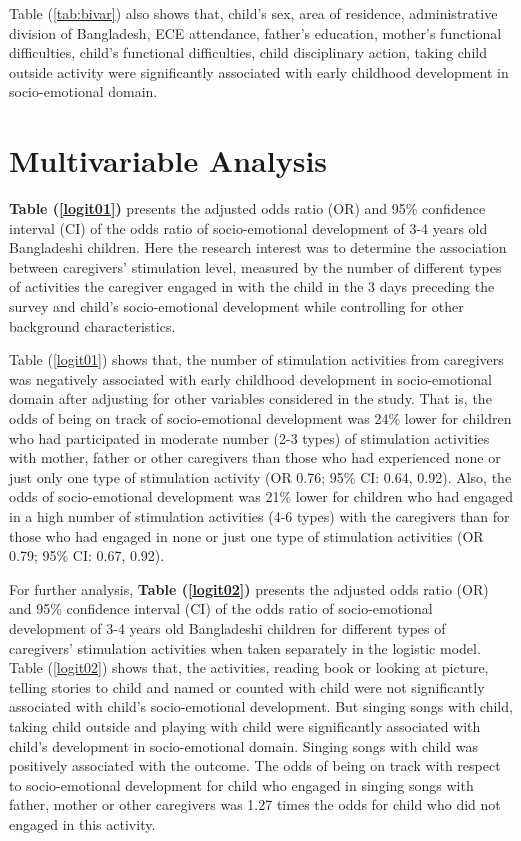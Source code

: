 \documentclass[
  12pt,
  oneside]{report}
\begin{document}
Table (\ref{tab:bivar}) also shows that, child's sex, area of residence, administrative division of Bangladesh, ECE attendance, father's education, mother's functional difficulties, child's functional difficulties, child disciplinary action, taking child outside activity were significantly associated with early childhood development in socio-emotional domain.

\clearpage

\hypertarget{multivariable-analysis}{%
\section{Multivariable Analysis}\label{multivariable-analysis}}

\textbf{Table (\ref{logit01})} presents the adjusted odds ratio (OR) and 95\% confidence interval (CI) of the odds ratio of socio-emotional development of 3-4 years old Bangladeshi children. Here the research interest was to determine the association between caregivers' stimulation level, measured by the number of different types of activities the caregiver engaged in with the child in the 3 days preceding the survey and child's socio-emotional development while controlling for other background characteristics.

Table (\ref{logit01}) shows that, the number of stimulation activities from caregivers was negatively associated with early childhood development in socio-emotional domain after adjusting for other variables considered in the study. That is, the odds of being on track of socio-emotional development was 24\% lower for children who had participated in moderate number (2-3 types) of stimulation activities with mother, father or other caregivers than those who had experienced none or just only one type of stimulation activity (OR 0.76; 95\% CI: 0.64, 0.92). Also, the odds of socio-emotional development was 21\% lower for children who had engaged in a high number of stimulation activities (4-6 types) with the caregivers than for those who had engaged in none or just one type of stimulation activities (OR 0.79; 95\% CI: 0.67, 0.92).

For further analysis, \textbf{Table (\ref{logit02})} presents the adjusted odds ratio (OR) and 95\% confidence interval (CI) of the odds ratio of socio-emotional development of 3-4 years old Bangladeshi children for different types of caregivers' stimulation activities when taken separately in the logistic model. Table (\ref{logit02}) shows that, the activities, reading book or looking at picture, telling stories to child and named or counted with child were not significantly associated with child's socio-emotional development. But singing songs with child, taking child outside and playing with child were significantly associated with child's development in socio-emotional domain. Singing songs with child was positively associated with the outcome. The odds of being on track with respect to socio-emotional development for child who engaged in singing songs with father, mother or other caregivers was 1.27 times the odds for child who did not engaged in this activity.
\end{document}
